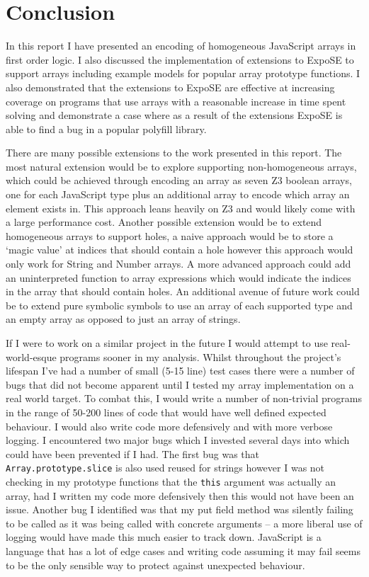 \documentclass[]{final_report}
\begin{document}
\chapter{Conclusion}
In this report I have presented an encoding of homogeneous JavaScript arrays in first order logic. I also discussed the implementation of extensions to ExpoSE to support arrays including example models for popular array prototype functions. I also demonstrated that the extensions to ExpoSE are effective at increasing coverage on programs that use arrays with a reasonable increase in time spent solving and demonstrate a case where as a result of the extensions ExpoSE is able to find a bug in a popular polyfill library.

There are many possible extensions to the work presented in this report. The most natural extension would be to explore supporting non-homogeneous arrays, which could be achieved through encoding an array as seven Z3 boolean arrays, one for each JavaScript type plus an additional array to encode which array an element exists in. This approach leans heavily on Z3 and would likely come with a large performance cost. Another possible extension would be to extend homogeneous arrays to support holes, a naive approach would be to store a `magic value' at indices that should contain a hole however this approach would only work for String and Number arrays. A more advanced approach could add an uninterpreted function to array expressions which would indicate the indices in the array that should contain holes. An additional avenue of future work could be to extend pure symbolic symbols to use an array of each supported type and an empty array as opposed to just an array of strings.

If I were to work on a similar project in the future I would attempt to use real-world-esque programs sooner in my analysis. Whilst throughout the project's lifespan I've had a number of small (5-15 line) test cases there were a number of bugs that did not become apparent until I tested my array implementation on a real world target. To combat this, I would write a number of non-trivial programs in the range of 50-200 lines of code that would have well defined expected behaviour. I would also write code more defensively and with more verbose logging. I encountered two major bugs which I invested several days into which could have been prevented if I had. The first bug was that \lstinline|Array.prototype.slice| is also used reused for strings however I was not checking in my prototype functions that the \lstinline|this| argument was actually an array, had I written my code more defensively then this would not have been an issue. Another bug I identified was that my put field method was silently failing to be called as it was being called with concrete arguments -- a more liberal use of logging would have made this much easier to track down. JavaScript is a language that has a lot of edge cases and writing code assuming it may fail seems to be the only sensible way to protect against unexpected behaviour.
\end{document}
